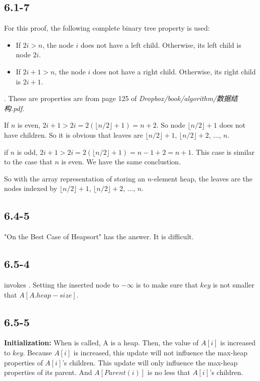 \documentclass{book}
\begin{document}
\begin{CJK}{UTF8}{gkai}
\subsection*{6.1-7}
For this proof, the following complete binary tree property is used:
\begin{itemize}
  \item If $2i > n$, the node $i$ does not have a left child.  Otherwise, its 
    left child is node $2i$.
  \item If $2i+1 > n$, the node $i$ does not have a right child.  Otherwise, its 
    right child is $2i+1$.
\end{itemize}.  These are properties are from page 125 of
\textit{Dropbox/book/algorithm/数据结构.pdf}.

If $n$ is even, $2i+1 > 2i = 2(\lfloor n/2 \rfloor +1) = n + 2$. So node 
$\lfloor n/2 \rfloor + 1$ does not have children. So it is obvious that leaves 
are $\lfloor n/2 \rfloor + 1$, $\lfloor n/2 \rfloor + 2$, ..., $n$.

if $n$ is odd, $2i+1 > 2i = 2(\lfloor n/2 \rfloor +1) = n -1 + 2 = n + 1$. This 
case is similar to the case that $n$ is even. We have the same conclustion.

So with the array representation of storing an $n$-element heap, the leaves are 
the nodes indexed by $\lfloor n/2 \rfloor + 1$, $\lfloor n/2 \rfloor + 2$, ..., 
$n$.

\subsection*{6.4-5}
"On the Best Case of Heapsort" has the answer. It is difficult.

\subsection*{6.5-4}
 invokes . Setting the inserted 
node to $-\infty$ is to make sure that $key$ is not smaller that 
$A[A.heap-size]$.

\subsection*{6.5-5}
\textbf{Initialization:} When  is called, A is a heap.  
Then, the value of $A[i]$ is increased to $key$. Because $A[i]$ is increased, 
this update will not influence the max-heap properties of $A[i]$'s children.  
This update will only influence the max-heap properties of its parent. And 
$A[Parent(i)]$ is no less that $A[i]$'s children.


\end{CJK}
\end{document}
